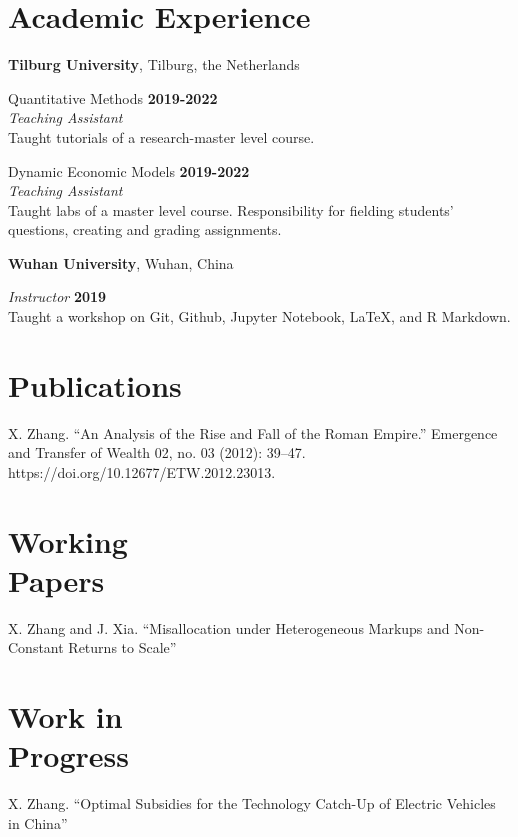 \documentclass[margin,line]{res}
\begin{document}
\begin{resume}
\section{\sc Academic Experience}
{\bf Tilburg University}, Tilburg, the Netherlands

\vspace{-.3cm}
Quantitative Methods \hfill {\bf 2019-2022}\\
 {\em Teaching Assistant}\\
 Taught tutorials of a research-master level course. 

\vspace{-.3cm}
Dynamic Economic Models \hfill {\bf 2019-2022}\\
{\em Teaching Assistant}\\
Taught labs of a master level course. Responsibility for fielding students' questions, creating and grading assignments.  


{\bf Wuhan University}, Wuhan, China

\vspace{-.3cm}
{\em Instructor} \hfill {\bf 2019}\\
Taught a workshop on Git, Github, Jupyter Notebook, \LaTeX, and R Markdown.

\section{\sc Publications}
X. Zhang. ``An Analysis of the Rise and Fall of the Roman Empire.'' Emergence and Transfer of Wealth 02, no. 03 (2012): 39–47.
https://doi.org/10.12677/ETW.2012.23013.

\section{\sc Working \\ Papers}
X. Zhang and J. Xia. ``Misallocation under Heterogeneous Markups and Non-Constant Returns to Scale''

\section{\sc Work in \\ Progress}
X. Zhang. ``Optimal Subsidies for the Technology Catch-Up of Electric Vehicles in China''


\end{resume}
\end{document}
